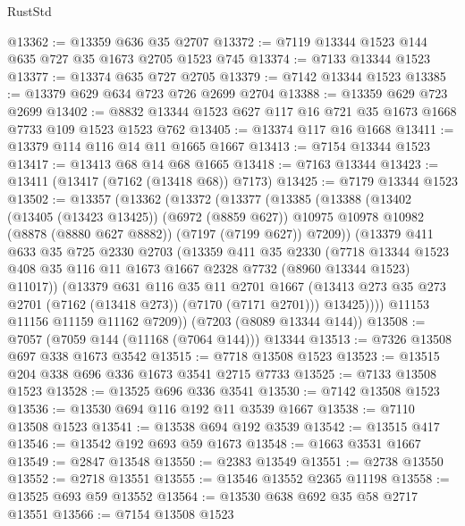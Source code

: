 \begin{lexlean}{RustStd}
\begin{coremodule}
@13362 := @13359 @636 @35 @2707
@13372 := @7119 @13344 @1523 @144 @635 @727 @35 @1673 @2705 @1523 @745
@13374 := @7133 @13344 @1523
@13377 := @13374 @635 @727 @2705
@13379 := @7142 @13344 @1523
@13385 := @13379 @629 @634 @723 @726 @2699 @2704
@13388 := @13359 @629 @723 @2699
@13402 := @8832 @13344 @1523 @627 @117 @16 @721 @35 @1673 @1668 @7733 @109 @1523 @1523 @762
@13405 := @13374 @117 @16 @1668
@13411 := @13379 @114 @116 @14 @11 @1665 @1667
@13413 := @7154 @13344 @1523
@13417 := @13413 @68 @14 @68 @1665
@13418 := @7163 @13344
@13423 := @13411 (@13417 (@7162 (@13418 @68)) @7173)
@13425 := @7179 @13344 @1523
@13502 := @13357
    (@13362
      (@13372
        (@13377
          (@13385
            (@13388
              (@13402
                (@13405 (@13423 @13425))
                (@6972 (@8859 @627))
                @10975
                @10978
                @10982
                (@8878 (@8880 @627 @8882))
                (@7197 (@7199 @627))
                @7209))
            (@13379
              @411
              @633
              @35
              @725
              @2330
              @2703
              (@13359
                @411
                @35
                @2330
                (@7718
                  @13344
                  @1523
                  @408
                  @35
                  @116
                  @11
                  @1673
                  @1667
                  @2328
                  @7732
                  (@8960 @13344 @1523)
                  @11017))
              (@13379
                @631
                @116
                @35
                @11
                @2701
                @1667
                (@13413 @273 @35 @273 @2701 (@7162 (@13418 @273)) (@7170 (@7171 @2701)))
                @13425))))
        @11153
        @11156
        @11159
        @11162
        @7209))
    (@7203 (@8089 @13344 @144))
@13508 := @7057 (@7059 @144 (@11168 (@7064 @144))) @13344
@13513 := @7326 @13508 @697 @338 @1673 @3542
@13515 := @7718 @13508 @1523
@13523 := @13515 @204 @338 @696 @336 @1673 @3541 @2715 @7733
@13525 := @7133 @13508 @1523
@13528 := @13525 @696 @336 @3541
@13530 := @7142 @13508 @1523
@13536 := @13530 @694 @116 @192 @11 @3539 @1667
@13538 := @7110 @13508 @1523
@13541 := @13538 @694 @192 @3539
@13542 := @13515 @417
@13546 := @13542 @192 @693 @59 @1673
@13548 := @1663 @3531 @1667
@13549 := @2847 @13548
@13550 := @2383 @13549
@13551 := @2738 @13550
@13552 := @2718 @13551
@13555 := @13546 @13552 @2365 @11198
@13558 := @13525 @693 @59 @13552
@13564 := @13530 @638 @692 @35 @58 @2717 @13551
@13566 := @7154 @13508 @1523

\end{coremodule}
\end{lexlean}
